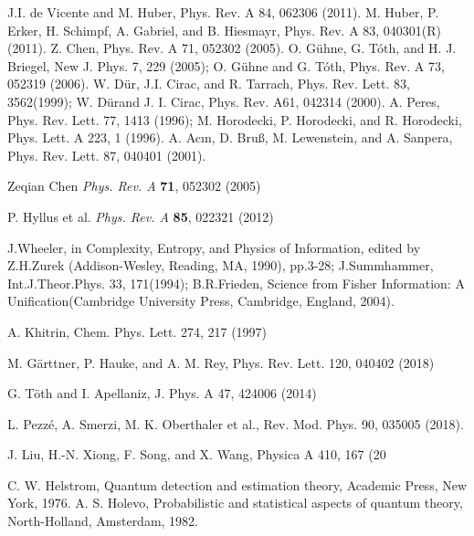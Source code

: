 \begin{thebibliography}{}
 J.I. de Vicente and M. Huber, Phys. Rev. A 84, 062306 (2011).
 M. Huber, P. Erker, H. Schimpf, A. Gabriel, and B. Hiesmayr, Phys. Rev. A 83, 040301(R) (2011).
 Z. Chen, Phys. Rev. A 71, 052302 (2005).
 O. G\"uhne, G. T\'oth, and H. J. Briegel, New J. Phys. 7, 229 (2005);
  O. G\"uhne and G. T\'oth, Phys. Rev. A 73, 052319 (2006).
 W. D\"ur, J.I. Cirac, and R. Tarrach, Phys. Rev. Lett. 83, 3562(1999);
 W. D\"urand J. I. Cirac, Phys. Rev. A61, 042314 (2000).
 A. Peres, Phys. Rev. Lett. 77, 1413 (1996);
 M. Horodecki, P. Horodecki, and R. Horodecki, Phys. Lett. A 223, 1 (1996).
 A. Acın, D. Bruß, M. Lewenstein, and A. Sanpera, Phys. Rev. Lett. 87, 040401 (2001).


 Zeqian Chen \textit{Phys. Rev. A} \textbf{71}, 052302 (2005)

 P. Hyllus et al. \textit{Phys. Rev. A} \textbf{85}, 022321 (2012)


 J.Wheeler, in Complexity, Entropy, and Physics of Information, edited by Z.H.Zurek (Addison-Wesley, Reading, MA, 1990), pp.3-28;
J.Summhammer, Int.J.Theor.Phys. 33, 171(1994);
 B.R.Frieden, Science from Fisher Information: A Unification(Cambridge University Press, Cambridge, England, 2004).

 A. Khitrin, Chem. Phys. Lett. 274, 217 (1997)

 M. G\"arttner, P. Hauke, and A. M. Rey, Phys. Rev. Lett. 120, 040402 (2018)

 G. T\"oth and I. Apellaniz, J. Phys. A 47, 424006 (2014)

 L. Pezz\'e, A. Smerzi, M. K. Oberthaler et al., Rev. Mod. Phys. 90, 035005 (2018).

 J. Liu, H.-N. Xiong, F. Song, and X. Wang, Physica A 410, 167 (20


 C. W. Helstrom, Quantum detection and estimation theory, Academic Press, New York, 1976.
 A. S. Holevo, Probabilistic and statistical aspects of quantum theory, North-Holland, Amsterdam, 1982.




\end{thebibliography}
